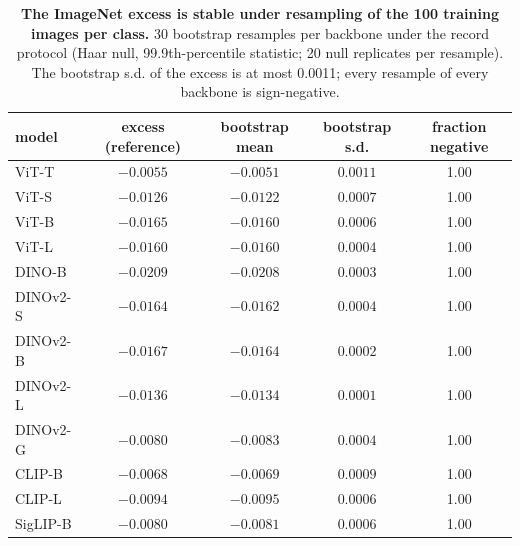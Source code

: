 \begin{table}[H]
\centering
\small
\begin{tabular}{lcccc}
\toprule
model & excess (reference) & bootstrap mean & bootstrap s.d. & fraction negative \\
\midrule
ViT-T & $-0.0055$ & $-0.0051$ & $0.0011$ & 1.00 \\
ViT-S & $-0.0126$ & $-0.0122$ & $0.0007$ & 1.00 \\
ViT-B & $-0.0165$ & $-0.0160$ & $0.0006$ & 1.00 \\
ViT-L & $-0.0160$ & $-0.0160$ & $0.0004$ & 1.00 \\
DINO-B & $-0.0209$ & $-0.0208$ & $0.0003$ & 1.00 \\
DINOv2-S & $-0.0164$ & $-0.0162$ & $0.0004$ & 1.00 \\
DINOv2-B & $-0.0167$ & $-0.0164$ & $0.0002$ & 1.00 \\
DINOv2-L & $-0.0136$ & $-0.0134$ & $0.0001$ & 1.00 \\
DINOv2-G & $-0.0080$ & $-0.0083$ & $0.0004$ & 1.00 \\
CLIP-B & $-0.0068$ & $-0.0069$ & $0.0009$ & 1.00 \\
CLIP-L & $-0.0094$ & $-0.0095$ & $0.0006$ & 1.00 \\
SigLIP-B & $-0.0080$ & $-0.0081$ & $0.0006$ & 1.00 \\
\bottomrule
\end{tabular}
\caption{\textbf{The ImageNet excess is stable under resampling of the 100 training images per class.} 30 bootstrap resamples per backbone under the record protocol (Haar null, 99.9th-percentile statistic; 20 null replicates per resample). The bootstrap s.d. of the excess is at most 0.0011; every resample of every backbone is sign-negative. %
}
\label{tab:b36-bootstrap}
\end{table}
